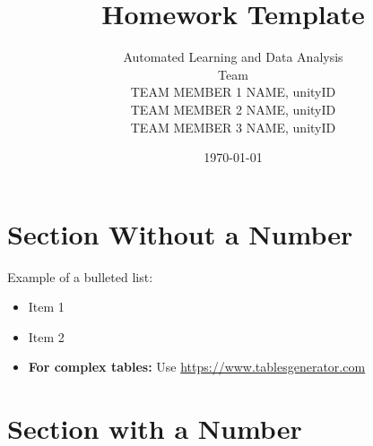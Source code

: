 \documentclass{article}
\title{Homework Template}
\author{Automated Learning and Data Analysis \\ 
Team \team \\
TEAM MEMBER 1 NAME, unityID \\
TEAM MEMBER 2 NAME, unityID \\
TEAM MEMBER 3 NAME, unityID \\
}
\date{\today}
\begin{document}
\maketitle

\section*{Section Without a Number}

Example of a bulleted list:
\begin{itemize}
    \item Item 1
    \item Item 2
    \item  \textbf{For complex tables:} Use \url{https://www.tablesgenerator.com}
\end{itemize}

\section{Section with a Number}
\end{document}
